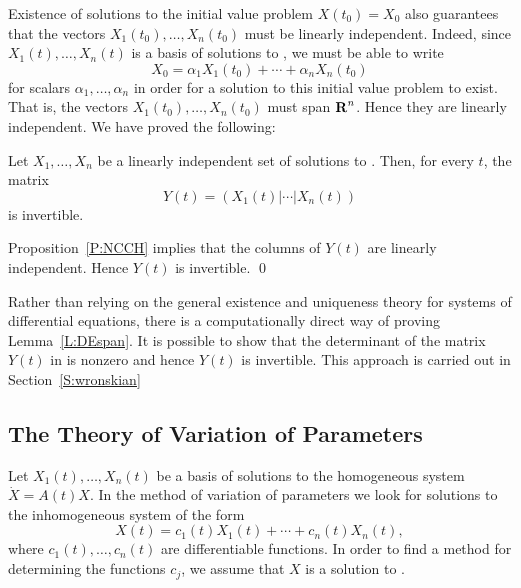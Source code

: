 \documentclass{ximera}
\begin{document}
Existence of solutions to the initial value problem $X(t_0)=X_0$ also
guarantees that the vectors $X_1(t_0),\ldots,X_n(t_0)$ must be linearly 
independent.  
Indeed, since $X_1(t),\ldots,X_n(t)$ is a 
basis of solutions to
, we must be able to write 
\[
X_0 = \alpha_1X_1(t_0) + \cdots + \alpha_nX_n(t_0)
\]
for scalars $\alpha_1,\ldots,\alpha_n$ in order for a solution to this 
initial value problem to exist.  That is, the vectors 
$X_1(t_0),\ldots,X_n(t_0)$  must span $\mbox{$\bf{R}$}^n$.   Hence they are linearly 
independent.  We have proved the following:

\begin{lemma}  \label{L:DEspan}
Let $X_1,\ldots,X_n$ be a linearly independent 
set of solutions to .
Then, for every $t$, the matrix 
\begin{equation}   \label{E:Y(t)}
Y(t) = \left(X_1(t)|\cdots |X_n(t)\right) 
\end{equation}
is invertible.
\end{lemma}

\proof  Proposition~\ref{P:NCCH} implies that the columns of $Y(t)$ are 
linearly independent.  Hence $Y(t)$ is invertible.  \qed

Rather than relying on the general existence and uniqueness theory for
systems of differential equations, there is a computationally direct way of 
proving Lemma~\ref{L:DEspan}.   It is possible to show that the determinant 
of the matrix $Y(t)$ in  is nonzero and hence $Y(t)$ is invertible.
This approach is carried out in Section~\ref{S:wronskian}


\subsection*{The Theory of Variation of Parameters}

Let $X_1(t),\ldots,X_n(t)$ be a 
basis of solutions to the homogeneous 
system $\dot{X}=A(t)X$.   In the method of variation of parameters we look 
for solutions to  the inhomogeneous system  of the form
\[
X(t) = c_1(t)X_1(t) + \cdots + c_n(t)X_n(t),
\]
where $c_1(t),\ldots,c_n(t)$ are differentiable functions.  In order to 
find a method for determining the functions $c_j$, we assume that $X$ is 
a solution to .  
\end{document}
